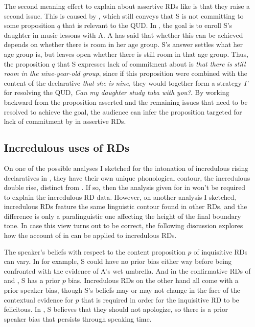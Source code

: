 \documentclass[output=paper,colorlinks,citecolor=brown]{langscibook}
\begin{document}
	The second meaning effect to explain about assertive RDs like  is that they raise a second issue. This is caused by \rise, which still conveys that S is not committing to some proposition $q$ that is relevant to the QUD. In , the goal is to enroll S's daughter in music lessons with A. A has said that whether this can be achieved depends on whether there is room in her age group. S's answer settles what her age group is, but leaves open whether there is still room in that age group. Thus, the proposition $q$ that S expresses lack of commitment about is \emph{that there is still room in the nine-year-old group}, since if this proposition were combined with  the content of the declarative \emph{that she is nine}, they would together form a strategy $\Gamma$ for resolving the QUD, \emph{Can my daughter study tuba with you?}. By working backward from the proposition asserted and the remaining issues that need to be resolved to achieve the goal, the audience can infer the proposition targeted for lack of commitment by \rise in assertive RDs. 
	
	
	
\subsection{Incredulous uses of RDs} \label{incredRDs}
	
	
	On one of the possible analyses I sketched for the intonation of incredulous rising declaratives in , they have their own unique phonological contour, the incredulous double rise, distinct from \rise. If so, then the analysis given for \rise in  won't be required to explain the incredulous RD data. However, on another analysis I sketched, incredulous RDs feature the same linguistic contour \rise found in other RDs, and the difference is only a paralinguistic one affecting the height of the final boundary tone. In case this view turns out to be correct, the following discussion explores how the account of \rise in  can be applied to incredulous RDs.
	
	The speaker's beliefs with respect to the content proposition $p$ of inquisitive RDs can vary. In  for example,  S could have no prior bias either way before being confronted with the evidence of A's wet umbrella. And in the confirmative RDs of  and , S has a prior $p$ bias. Incredulous RDs on the other hand all come with a prior \notp speaker bias, though S's beliefs may or may not change in the face of the contextual evidence for $p$ that is required in order for the inquisitive RD to be felicitous. In , S believes that they should not apologize, so there is a prior \notp speaker bias that persists through speaking time.
	
\end{document}
